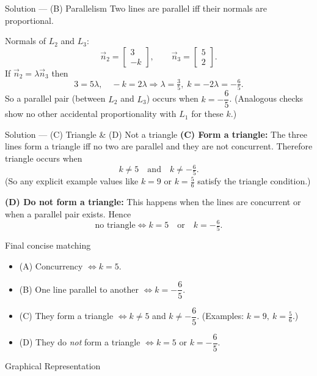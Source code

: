 \documentclass{beamer}
\newcommand{\myvec}[1]{\begin{bmatrix}#1\end{bmatrix}}
\begin{document}
\begin{frame}{Solution — (B) Parallelism}
Two lines are parallel iff their normals are proportional.

Normals of \(L_2\) and \(L_3\):
\[
\vec{n}_2=\myvec{3\\-k},\qquad \vec{n}_3=\myvec{5\\2}.
\]
If \(\vec{n}_2=\lambda\vec{n}_3\) then
\[
3=5\lambda,\quad -k=2\lambda \Rightarrow \lambda=\tfrac{3}{5},\; k=-2\lambda = -\tfrac{6}{5}.
\]
So a parallel pair (between \(L_2\) and \(L_3\)) occurs when \(k=-\dfrac{6}{5}\).
(Analogous checks show no other accidental proportionality with \(L_1\) for these \(k\).)
\end{frame}

\begin{frame}{Solution — (C) Triangle \& (D) Not a triangle}
\textbf{(C) Form a triangle:} The three lines form a triangle iff no two are parallel and they are not concurrent.  
Therefore triangle occurs when
\[
k\neq 5 \quad\text{and}\quad k\neq -\tfrac{6}{5}.
\]
(So any explicit example values like \(k=9\) or \(k=\tfrac{5}{6}\) satisfy the triangle condition.)

\medskip
\textbf{(D) Do not form a triangle:} This happens when the lines are concurrent or when a parallel pair exists. Hence
\[
\text{no triangle} \iff k=5 \quad\text{or}\quad k=-\tfrac{6}{5}.
\]
\end{frame}

\begin{frame}{Final concise matching}
\begin{itemize}
  \item (A) Concurrency \(\iff k=5\).
  \item (B) One line parallel to another \(\iff k=-\dfrac{6}{5}\).
  \item (C) They form a triangle \(\iff k\neq 5\) and \(k\neq -\dfrac{6}{5}\). (Examples: \(k=9,\ k=\tfrac{5}{6}\).)
  \item (D) They do \emph{not} form a triangle \(\iff k=5\) or \(k=-\dfrac{6}{5}\).
\end{itemize}
\end{frame}

\begin{frame}{Graphical Representation}
\begin{center}
\end{center}
\end{frame}
\end{document}
